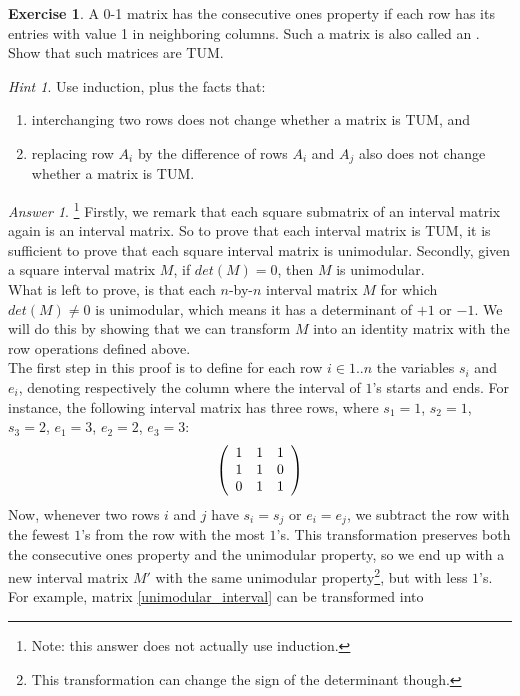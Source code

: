\documentclass[titlepage]{book}
\makeatletter
\newcommand{\concept}[2]{\toindex{#1}}
\newcommand\toindex{\@ifstar{\@dblarg{\@toindexs}}{\@toindex}}
\def\@toindexs[#1]#2{\indexlayout{#2}\index{#1@#2}}
\newcommand\@toindex[2][]{%
  \if\relax\detokenize{#1}\relax
    \indexlayout{#2}%
    \begingroup
    \@splitword#2\@nil%
    \uppercase\expandafter{%
      \expandafter\def\expandafter\@initial\expandafter{\@first}}%
    \toks0=\expandafter{\@initial}%
    \toks2=\expandafter{\@rest}%
    \edef\x{\endgroup\noexpand\index{\the\toks0 \the\toks2 }}\x
  \else
    \indexlayout{#2}\index{#1}
  \fi
}
\def\@splitword#1#2\@nil{\def\@first{#1}\def\@rest{#2}}
\newcommand{\indexlayout}[1]{\emph{#1}}
\theoremstyle{plain}
\theoremstyle{definition}
\newtheorem{exercise}{Exercise}[chapter]
\theoremstyle{remark}
\newtheorem{answer}{Answer}
\newtheorem{hint}{Hint}
\makeatother
\begin{document}
\begin{exercise}
A 0-1 matrix has the consecutive ones property if each row has its entries with value 1 in neighboring columns. Such a matrix is also called an \concept{interval matrix}{}. Show that such matrices are TUM.
\begin{hint}
Use induction, plus the facts that:
\begin{enumerate}
 \item interchanging two rows does not change whether a matrix is TUM, and
 \item replacing row $A_i$ by the difference of rows $A_i$ and $A_j$ also does not change whether a matrix is TUM.
\end{enumerate}
\end{hint}
\begin{answer}
\footnote{Note: this answer does not actually use induction.}
Firstly, we remark that each square submatrix of an interval matrix again is an interval matrix. So to prove that each interval matrix is TUM, it is sufficient to prove that each square interval matrix is unimodular. Secondly, given a square interval matrix $M$, if $det(M)=0$, then $M$ is unimodular.\\
What is left to prove, is that each $n$-by-$n$ interval matrix $M$ for which $det(M)\neq 0$ is unimodular, which means it has a determinant of $+1$ or $-1$. We will do this by showing that we can transform $M$ into an identity matrix with the row operations defined above.\\
The first step in this proof is to define for each row $i \in 1..n$ the variables $s_i$ and $e_i$, denoting respectively the column where the interval of $1$'s starts and ends. For instance, the following interval matrix has three rows, where $s_1=1$, $s_2=1$, $s_3=2$, $e_1=3$, $e_2=2$, $e_3=3$:
\begin{equation}
\label{unimodular_interval}
\left( \begin{array}{ccc}
1&1&1\\
1&1&0\\
0&1&1
\end{array} \right)
\end{equation}
Now, whenever two rows $i$ and $j$ have $s_i=s_j$ or $e_i=e_j$, we subtract the row with the fewest $1$'s from the row with the most $1$'s. This transformation preserves both the consecutive ones property and the unimodular property, so we end up with a new interval matrix $M'$ with the same unimodular property\footnote{This transformation can change the sign of the determinant though.}, but with less $1$'s. For example, matrix \ref{unimodular_interval} can be transformed into

\end{answer}
\end{exercise}
\end{document}
